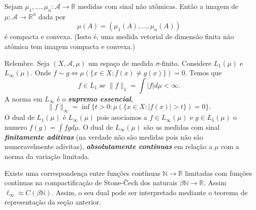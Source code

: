 \documentclass[portuguese]{article}
\theoremstyle{definition}
\newcommand{\R}{\mathbb{R}}
\newcommand{\N}{\mathbb{N}}
\begin{document}
\begin{teo}
	Sejam $\mu_1,\ldots,\mu_n:\mathcal{A}\to\R$ medidas com sinal não atômicas. Então a imagem de $\mu:\mathcal{A}\to\R^n$ dada por
	\[\mu(A)=(\mu_1(A),\ldots,\mu_n(A))\]
	é compacta e convexa. (Issto é, uma medida vetorial de dimensão finita não atômica tem imagem compacta e convexa.)
\end{teo}
\begin{obs}
	Relembre. Seja $(X,\mathcal{A},\mu)$ um espaço de medida $\sigma$-finito. Considere $L_1(\mu)$ e $L_\infty(\mu)$. Onde $f\sim g\iff \mu(\{x\in X:f(x)\neq g(x)\})=0$. Temos que 
	\[f\in L_1\text{ se }\|f\|_1=\int |f|d\mu<\infty.\]
	A norma em  $L_\infty$ é o \textbf{\textit{supremo essencial}},
	\[\|f\|_\infty=\inf\{t>0:\mu(\{x\in X:|f(x)|>t\})=0\}.\]
	O dual de $L_1(\mu)$ é $L_\infty(\mu)$ pois asociamos a $f\in L_\infty(\mu)$ e $g\in L_1(\mu)$ o numero $f(g)=\int fgd\mu$. O dual de $L_\infty(\mu)$ são as medidas com sinal \textbf{\textit{finitamente aditivas}} (na verdade não são medidas pois não são numeravelmente adivitas), \textbf{\textit{absolutamente contínuas}} em relação a $\mu$ com a norma da variação limitada.
	
	Existe uma correspondença entre funções contínuas $\N\to\R$ limitadas com funções contínuas na compactificação de Stone-\v Cech dos naturais $\beta\N\to\R$. Assim $\ell_\infty\approx C(\beta\N)$. Assim, o seu dual pode ser interpretado mediante o teorema de representação da seção anterior.
\end{obs}
\end{document}
